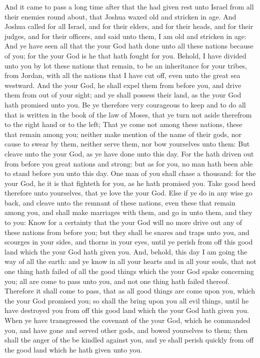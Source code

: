 \begin{biblechapter} %
 And it came to pass a long time after that the \LORD had given rest unto Israel from all their enemies round about, that Joshua waxed old and stricken in age.
\verse And Joshua called for all Israel, and for their elders, and for their heads, and for their judges, and for their officers, and said unto them, I am old and stricken in age:
\verse And ye have seen all that the \LORD your God hath done unto all these nations because of you; for the \LORD your God is he that hath fought for you.
\verse Behold, I have divided unto you by lot these nations that remain, to be an inheritance for your tribes, from Jordan, with all the nations that I have cut off, even unto the great sea westward.
\verse And the \LORD your God, he shall expel them from before you, and drive them from out of your sight; and ye shall possess their land, as the \LORD your God hath promised unto you.
\verse Be ye therefore very courageous to keep and to do all that is written in the book of the law of Moses, that ye turn not aside therefrom to the right hand or to the left;
\verse That ye come not among these nations, these that remain among you; neither make mention of the name of their gods, nor cause to swear by them, neither serve them, nor bow yourselves unto them:
\verse But cleave unto the \LORD your God, as ye have done unto this day.
\verse For the \LORD hath driven out from before you great nations and strong: but as for you, no man hath been able to stand before you unto this day.
\verse One man of you shall chase a thousand: for the \LORD your God, he it is that fighteth for you, as he hath promised you.
\verse Take good heed therefore unto yourselves, that ye love the \LORD your God.
\verse Else if ye do in any wise go back, and cleave unto the remnant of these nations, even these that remain among you, and shall make marriages with them, and go in unto them, and they to you:
\verse Know for a certainty that the \LORD your God will no more drive out any of these nations from before you; but they shall be snares and traps unto you, and scourges in your sides, and thorns in your eyes, until ye perish from off this good land which the \LORD your God hath given you.
\verse And, behold, this day I am going the way of all the earth: and ye know in all your hearts and in all your souls, that not one thing hath failed of all the good things which the \LORD your God spake concerning you; all are come to pass unto you, and not one thing hath failed thereof.
\verse Therefore it shall come to pass, that as all good things are come upon you, which the \LORD your God promised you; so shall the \LORD bring upon you all evil things, until he have destroyed you from off this good land which the \LORD your God hath given you.
\verse When ye have transgressed the covenant of the \LORD your God, which he commanded you, and have gone and served other gods, and bowed yourselves to them; then shall the anger of the \LORD be kindled against you, and ye shall perish quickly from off the good land which he hath given unto you.
\end{biblechapter}

